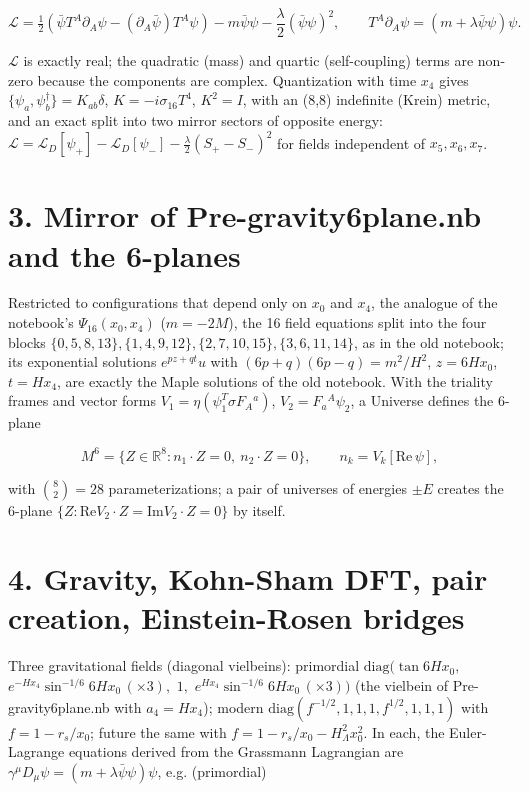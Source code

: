 \documentclass[10pt]{article}
\makeatletter
\newcommand\keepnext{\par\nopagebreak\@nobreaktrue\everypar{\@nobreakfalse\everypar{}}}
\makeatother
\begin{document}
\[
\mathcal L = \tfrac12\left(\bar\psi T^A\partial_A\psi - (\partial_A\bar\psi)T^A\psi\right) - m\bar\psi\psi - \frac\lambda2(\bar\psi\psi)^2,\qquad T^A\partial_A\psi = (m + \lambda\bar\psi\psi)\psi .
\]

$\mathcal L$ is exactly real; the quadratic (mass) and quartic (self-coupling) terms are non-zero because the components are complex. Quantization with time $x_4$ gives $\{\psi_a,\psi_b^\dagger\} = K_{ab}\delta$, $K = -i\sigma_{16}T^4$, $K^2 = I$, with an (8,8) indefinite (Krein) metric, and an exact split into two mirror sectors of opposite energy: $\mathcal L = \mathcal L_D[\psi_+] - \mathcal L_D[\psi_-] - \frac\lambda2(S_+-S_-)^2$ for fields independent of $x_5,x_6,x_7$.


\section*{3. Mirror of Pre-gravity6plane.nb and the 6-planes}

Restricted to configurations that depend only on $x_0$ and $x_4$, the analogue of the notebook's $\Psi_{16}(x_0,x_4)$ ($m = -2M$), the 16 field equations split into the four blocks $\{0,5,8,13\},\{1,4,9,12\},\{2,7,10,15\},\{3,6,11,14\}$, as in the old notebook; its exponential solutions $e^{pz+qt}u$ with $(6p+q)(6p-q) = m^2/H^2$, $z = 6Hx_0$, $t = Hx_4$, are exactly the Maple solutions of the old notebook. With the triality frames and vector forms $V_1 = \eta(\psi_1^T\sigma F_A{}^a)$, $V_2 = F_a{}^A\psi_2$, a Universe defines the 6-plane\keepnext


\[
M^6 = \{Z\in\mathbb R^8 : n_1\cdot Z = 0,\ n_2\cdot Z = 0\},\qquad n_k = V_k[\mathrm{Re}\,\psi],
\]

with $\binom82 = 28$ parameterizations; a pair of universes of energies $\pm E$ creates the 6-plane $\{Z:\mathrm{Re}V_2\cdot Z = \mathrm{Im}V_2\cdot Z = 0\}$ by itself.


\section*{4. Gravity, Kohn-Sham DFT, pair creation, Einstein-Rosen bridges}

Three gravitational fields (diagonal vielbeins): primordial $\mathrm{diag}(\tan6Hx_0,$ $e^{-Hx_4}\sin^{-1/6}6Hx_0\,(\times3),$ $1,$ $e^{Hx_4}\sin^{-1/6}6Hx_0\,(\times3))$ (the vielbein of Pre-gravity6plane.nb with $a_4 = Hx_4$); modern $\mathrm{diag}(f^{-1/2},1,1,1,f^{1/2},1,1,1)$ with $f = 1-r_s/x_0$; future the same with $f = 1 - r_s/x_0 - H_\Lambda^2x_0^2$. In each, the Euler-Lagrange equations derived from the Grassmann Lagrangian are $\gamma^\mu D_\mu\psi = (m+\lambda\bar\psi\psi)\psi$, e.g. (primordial)\keepnext
\end{document}
